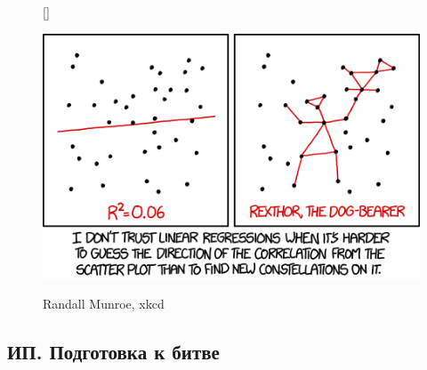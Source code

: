 \documentclass[12pt, a4paper]{article}\usepackage[]{graphicx}\usepackage[]{color}
\begin{document}
\begin{figure}[h!]
[\FBwidth]
{\caption*{Randall Munroe, xkcd}}
{\includegraphics[width=12cm]{figures/linear_regression.png}}
\end{figure}


\subsection{ИП. Подготовка к битве}
\end{document}
